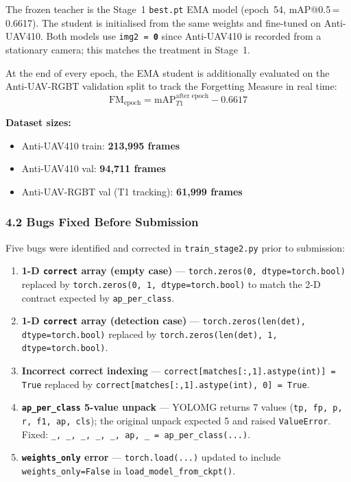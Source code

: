 The frozen teacher is the Stage~1 \texttt{best.pt} EMA model
(epoch~54, mAP@0.5\,=\,0.6617). The student is initialised from
the same weights and fine-tuned on Anti-UAV410. Both models
use \texttt{img2 = \textbf{0}} since Anti-UAV410 is recorded
from a stationary camera; this matches the treatment in Stage~1.

At the end of every epoch, the EMA student is additionally
evaluated on the Anti-UAV-RGBT validation split to track the
Forgetting Measure in real time:
\[
    \text{FM}_{\text{epoch}} =
    \text{mAP}_{T1}^{\text{after epoch}} - 0.6617
\]

\textbf{Dataset sizes:}
\begin{itemize}
    \item Anti-UAV410 train: \textbf{213,995 frames}
    \item Anti-UAV410 val: \textbf{94,711 frames}
    \item Anti-UAV-RGBT val (T1 tracking): \textbf{61,999 frames}
\end{itemize}

\subsubsection*{4.2 Bugs Fixed Before Submission}

Five bugs were identified and corrected in \texttt{train\_stage2.py}
prior to submission:

\begin{enumerate}
    \item \textbf{1-D \texttt{correct} array (empty case)} —
          \texttt{torch.zeros(0, dtype=torch.bool)} replaced by
          \texttt{torch.zeros(0, 1, dtype=torch.bool)} to match
          the 2-D contract expected by \texttt{ap\_per\_class}.

    \item \textbf{1-D \texttt{correct} array (detection case)} —
          \texttt{torch.zeros(len(det), dtype=torch.bool)} replaced
          by \texttt{torch.zeros(len(det), 1, dtype=torch.bool)}.

    \item \textbf{Incorrect correct indexing} —
          \texttt{correct[matches[:,1].astype(int)]\,=\,True}
          replaced by \texttt{correct[matches[:,1].astype(int),\,0]\,=\,True}.

    \item \textbf{\texttt{ap\_per\_class} 5-value unpack} —
          YOLOMG returns 7 values (\texttt{tp, fp, p, r, f1, ap, cls});
          the original unpack expected 5 and raised
          \texttt{ValueError}. Fixed:
          \texttt{\_, \_, \_, \_, \_, ap, \_ = ap\_per\_class(...)}.

    \item \textbf{\texttt{weights\_only} error} —
          \texttt{torch.load(...)} updated to include
          \texttt{weights\_only=False} in
          \texttt{load\_model\_from\_ckpt()}.
\end{enumerate}

